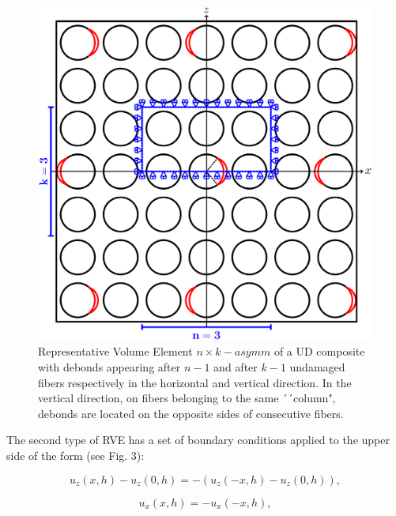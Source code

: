 \begin{figure}[!htb]
\centering
  \includegraphics[width=\textwidth]{paperD/asymm.pdf}
\caption{Representative Volume Element $n \times k-asymm$ of a UD composite with debonds appearing after $n-1$ and after $k-1$ undamaged fibers respectively in the horizontal and vertical direction. In the vertical direction, on fibers belonging to the same ´´column", debonds are located on the opposite sides of consecutive fibers.}\label{paperD:fig:asymm-rve}
\end{figure}

The second type of RVE has a set of boundary conditions applied to the upper side of the form (see Fig. 3):

\begin{equation}
u_{z}\left(x,h\right)-u_{z}\left(0,h\right)=-\left(u_{z}\left(-x,h\right)-u_{z}\left(0,h\right)\right),
\end{equation}

\begin{equation}
u_{x}\left(x,h\right)=-u_{x}\left(-x,h\right),
\end{equation}


